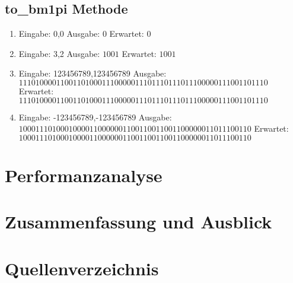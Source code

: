 \documentclass[course=erap]{aspdoc}
\begin{document}

\subsection{to\_bm1pi Methode}
\begin{enumerate}[label=\roman*)]
    \item Eingabe: 0,0 \quad  Ausgabe: $0$ \quad Erwartet: $0$
    \item Eingabe: 3,2 \quad Ausgabe: $1001$ \quad Erwartet: $1001$
    \item Eingabe: 123456789,123456789 \newline Ausgabe: $111010000110011010001110000011101110111011100000111001101110
    $ \newline Erwartet: $111010000110011010001110000011101110111011100000111001101110
    $
    \item Eingabe: -123456789,-123456789 \newline Ausgabe: $10001110100010000110000001100110011001100000011011100110
    $ \newline Erwartet:
    $10001110100010000110000001100110011001100000011011100110
    $
\end{enumerate}
\section{Performanzanalyse}

\section{Zusammenfassung und Ausblick}

\section{Quellenverzeichnis}


{}
\end{document}
